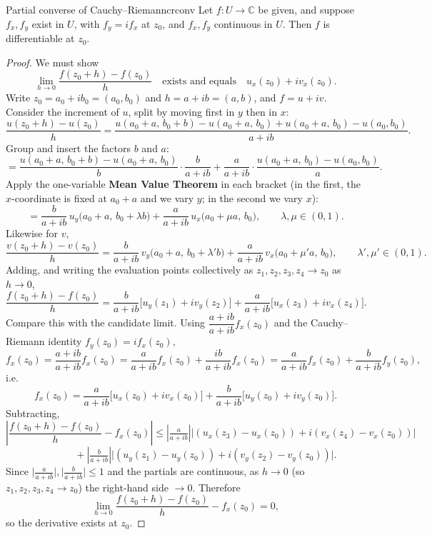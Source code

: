 \documentclass[11pt,openany]{report}
\newcommand{\C}{\mathbb{C}}
\newcommand{\abs}[1]{\left\lvert #1 \right\rvert}
\begin{document}
\begin{theorem}{Partial converse of Cauchy--Riemann}{crconv}
Let $f:U\to\C$ be given, and suppose $f_x,f_y$ exist in $U$, with $f_y = i f_x$ at $z_0$,
and $f_x,f_y$ continuous in $U$. Then $f$ is differentiable at $z_0$.
\end{theorem}

\begin{proof}
We must show
\[
  \lim_{h\to0}\frac{f(z_0+h)-f(z_0)}{h} \quad\text{exists and equals}\quad u_x(z_0)+i v_x(z_0).
\]
Write $z_0=a_0+ib_0=(a_0,b_0)$ and $h=a+ib=(a,b)$, and $f=u+iv$. Consider the increment of
$u$, split by moving first in $y$ then in $x$:
\[
  \frac{u(z_0+h)-u(z_0)}{h}
  = \frac{u(a_0+a,\,b_0+b) - u(a_0+a,\,b_0) + u(a_0+a,\,b_0) - u(a_0,b_0)}{a+ib}.
\]
Group and insert the factors $b$ and $a$:
\[
  = \frac{u(a_0+a,\,b_0+b) - u(a_0+a,\,b_0)}{b}\cdot\frac{b}{a+ib}
    + \frac{a}{a+ib}\cdot\frac{u(a_0+a,\,b_0)-u(a_0,b_0)}{a}.
\]
Apply the one-variable \textbf{Mean Value Theorem} in each bracket (in the first, the
$x$-coordinate is fixed at $a_0+a$ and we vary $y$; in the second we vary $x$):
\[
  = \frac{b}{a+ib}\,u_y\bigl(a_0+a,\,b_0+\lambda b\bigr)
    + \frac{a}{a+ib}\,u_x\bigl(a_0+\mu a,\,b_0\bigr),
  \qquad \lambda,\mu\in(0,1).
\]
Likewise for $v$,
\[
  \frac{v(z_0+h)-v(z_0)}{h}
  = \frac{b}{a+ib}\,v_y\bigl(a_0+a,\,b_0+\lambda' b\bigr)
    + \frac{a}{a+ib}\,v_x\bigl(a_0+\mu' a,\,b_0\bigr),
  \qquad \lambda',\mu'\in(0,1).
\]
Adding, and writing the evaluation points collectively as $z_1,z_2,z_3,z_4\to z_0$ as
$h\to0$,
\[
  \frac{f(z_0+h)-f(z_0)}{h}
  = \frac{b}{a+ib}\bigl[u_y(z_1)+i v_y(z_2)\bigr]
    + \frac{a}{a+ib}\bigl[u_x(z_3)+i v_x(z_4)\bigr].
\]
Compare this with the candidate limit. Using $\dfrac{a+ib}{a+ib}f_x(z_0)$ and the
Cauchy--Riemann identity $f_y(z_0)=i f_x(z_0)$,
\[
  f_x(z_0)
  = \frac{a+ib}{a+ib}f_x(z_0)
  = \frac{a}{a+ib}f_x(z_0) + \frac{ib}{a+ib}f_x(z_0)
  = \frac{a}{a+ib}f_x(z_0) + \frac{b}{a+ib}f_y(z_0),
\]
i.e.
\[
  f_x(z_0)
  = \frac{a}{a+ib}\bigl[u_x(z_0)+i v_x(z_0)\bigr]
    + \frac{b}{a+ib}\bigl[u_y(z_0)+i v_y(z_0)\bigr].
\]
Subtracting,
\[
  \abs{\frac{f(z_0+h)-f(z_0)}{h} - f_x(z_0)}
  \le \abs{\tfrac{a}{a+ib}}\bigl\lvert (u_x(z_3)-u_x(z_0)) + i(v_x(z_4)-v_x(z_0))\bigr\rvert
\]
\[
  \qquad\qquad + \abs{\tfrac{b}{a+ib}}\bigl\lvert (u_y(z_1)-u_y(z_0)) + i(v_y(z_2)-v_y(z_0))\bigr\rvert .
\]
Since $\big\lvert\frac{a}{a+ib}\big\rvert,\big\lvert\frac{b}{a+ib}\big\rvert\le1$ and the
partials are continuous, as $h\to0$ (so $z_1,z_2,z_3,z_4\to z_0$) the right-hand side
$\to0$. Therefore
\[
  \lim_{h\to0}\frac{f(z_0+h)-f(z_0)}{h} - f_x(z_0) = 0,
\]
so the derivative exists at $z_0$.
\end{proof}
\end{document}
